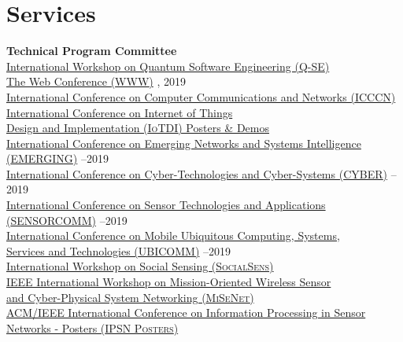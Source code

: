 
\section{\sc Services}
{\bf Technical Program Committee}\\
{\href{https://q-se.github.io/qse2021/}{International Workshop on Quantum Software Engineering (\textsc{Q-SE})}} \\
{\href{https://www2019.thewebconf.org/}{The Web Conference (\textsc{WWW})}} , 2019\\
{\href{http://www.icccn.org//}{International Conference on Computer Communications and Networks (\textsc{ICCCN})}} \\
{\href{http://conferences.computer.org/iotDI/2019/}{International Conference on Internet of Things \\\mbox{\hspace{0.6cm}} Design and Implementation (\textsc{IoTDI}) Posters \& Demos}} \\
{\href{http://www.iaria.org/conferences2019/EMERGING19.html}{International Conference on Emerging Networks and Systems Intelligence \\\mbox{\hspace{0.6cm}} (\textsc{EMERGING})}} --2019\\
{\href{http://www.iaria.org/conferences2019/CYBER19.html}{International Conference on Cyber-Technologies and Cyber-Systems (\textsc{CYBER})}} --2019\\
{\href{http://www.iaria.org/conferences2019/SENSORCOMM19.html}{International Conference on Sensor Technologies and Applications \\\mbox{\hspace{0.6cm}} (\textsc{SENSORCOMM})}} --2019\\
{\href{http://www.iaria.org/conferences2019/UBICOMM18.html}{International Conference on Mobile Ubiquitous Computing, Systems,\\\mbox{\hspace{0.6cm}} Services and Technologies (\textsc{UBICOMM})}} --2019\\
{\href{https://www.cse.buffalo.edu/~lusu/SocialSens2018/}{International Workshop on Social Sensing (\textsc{SocialSens})}} \\
{\href{http://infocom2018.ieee-infocom.org/content/workshop-misenet-mission-oriented-wireless-sensor-networking}{IEEE International Workshop on Mission-Oriented Wireless Sensor \\\mbox{\hspace{0.6cm}} and Cyber-Physical System Networking (\textsc{MiSeNet})}} \\
{\href{http://ipsn.acm.org/2016/posters.html}{ACM/IEEE International Conference on Information Processing in Sensor\\\mbox{\hspace{0.6cm}} Networks - Posters (\textsc{IPSN Posters})}} \\
\vspace{-0.6cm}

